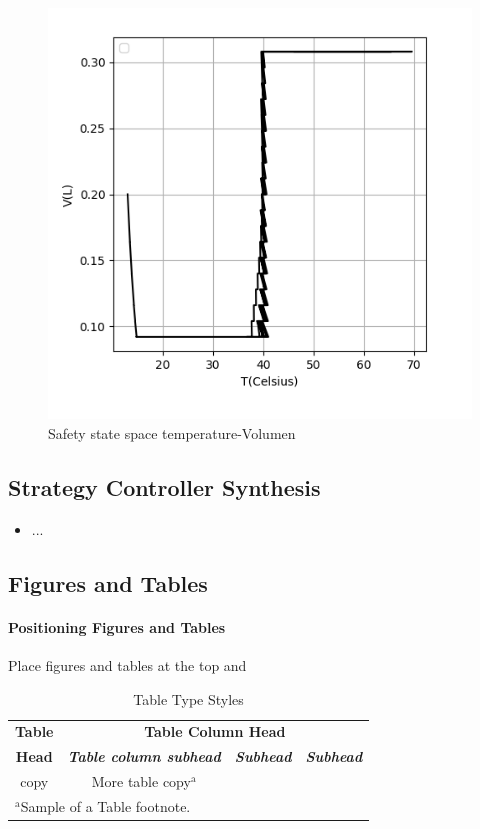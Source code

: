 \documentclass[conference]{IEEEtran}
\begin{document}
\begin{figure}[H]  %
\includegraphics[scale = 0.4]{5}
\centering
\caption{Safety state space temperature-Volumen}
\centering
\end{figure}
  




\subsection{Strategy Controller Synthesis}
\begin{itemize}
\item  ...
\end{itemize}




\subsection{Figures and Tables}
\paragraph{Positioning Figures and Tables} Place figures and tables at the top and 


\begin{table}[htbp]
\caption{Table Type Styles}
\begin{center}
\begin{tabular}{|c|c|c|c|}
\hline
\textbf{Table}&\multicolumn{3}{|c|}{\textbf{Table Column Head}} \\
\cline{2-4} 
\textbf{Head} & \textbf{\textit{Table column subhead}}& \textbf{\textit{Subhead}}& \textbf{\textit{Subhead}} \\
\hline
copy& More table copy$^{\mathrm{a}}$& &  \\
\hline
\multicolumn{4}{l}{$^{\mathrm{a}}$Sample of a Table footnote.}
\end{tabular}
\label{tab1}
\end{center}
\end{table}
\end{document}
